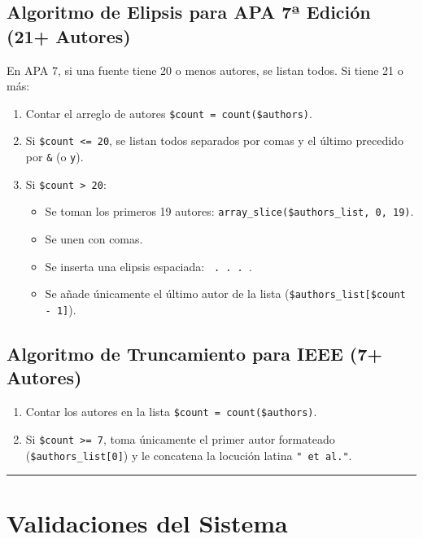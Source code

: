 \documentclass[11pt, a4paper]{article}
\begin{document}
\subsection{Algoritmo de Elipsis para APA 7ª Edición (21+ Autores)}
En APA 7, si una fuente tiene 20 o menos autores, se listan todos. Si tiene 21 o más:

\begin{enumerate}
\item Contar el arreglo de autores \texttt{\$count = count(\$authors)}.
\item Si \texttt{\$count <= 20}, se listan todos separados por comas y el último precedido por \texttt{\&} (o \texttt{y}).
\item Si \texttt{\$count > 20}:
\begin{itemize}
\item Se toman los primeros 19 autores: \texttt{array\_slice(\$authors\_list, 0, 19)}.
\item Se unen con comas.
\item Se inserta una elipsis espaciada: \texttt{ . . . }.
\item Se añade únicamente el último autor de la lista (\texttt{\$authors\_list[\$count - 1]}).
\end{itemize}
\end{enumerate}
\subsection{Algoritmo de Truncamiento para IEEE (7+ Autores)}
\begin{enumerate}
\item Contar los autores en la lista \texttt{\$count = count(\$authors)}.
\item Si \texttt{\$count >= 7}, toma únicamente el primer autor formateado (\texttt{\$authors\_list[0]}) y le concatena la locución latina \texttt{" et al."}.
\end{enumerate}

\bigskip\noindent\rule{\textwidth}{0.4pt}\bigskip


\section{Validaciones del Sistema}
\end{document}
